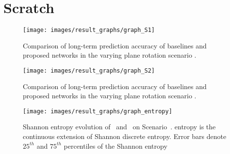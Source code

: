 \clearpage\section*{Scratch}





\begin{figure}[t]
    \centering
    \texttt{[image: images/result\_graphs/graph\_S1]}
    \caption{Comparison of long-term prediction accuracy of baselines and proposed networks in the varying plane rotation scenario \sone.}
    \label{fig:result_s1}
\end{figure}

\begin{figure}[t]
    \centering
    \texttt{[image: images/result\_graphs/graph\_S2]}
    \caption{Comparison of long-term prediction accuracy of baselines and proposed networks in the varying plane rotation scenario \stwo.}
    \label{fig:result_s2}
\end{figure}
\fi

\begin{figure}[t]
    \centering
    \texttt{[image: images/result\_graphs/graph\_entropy]}
    \caption{Shannon entropy evolution of \NetThree\ and \NetFour\ on Scenario~\sone. \NetThree entropy  is the continuous extension of Shannon discrete entropy. Error bars denote $25^{th}$ and $75^{th}$ percentiles of the Shannon entropy}
    \label{fig:entropy}
\end{figure}
